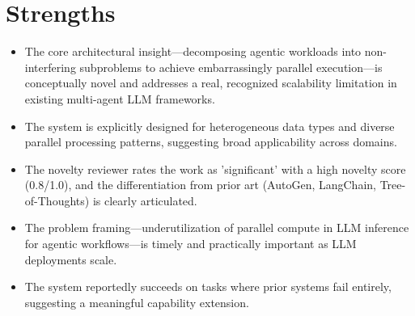 \documentclass[11pt]{article}
\begin{document}
\section*{Strengths}
\begin{itemize}[leftmargin=*]
  \item The core architectural insight—decomposing agentic workloads into non-interfering subproblems to achieve embarrassingly parallel execution—is conceptually novel and addresses a real, recognized scalability limitation in existing multi-agent LLM frameworks.
  \item The system is explicitly designed for heterogeneous data types and diverse parallel processing patterns, suggesting broad applicability across domains.
  \item The novelty reviewer rates the work as 'significant' with a high novelty score (0.8/1.0), and the differentiation from prior art (AutoGen, LangChain, Tree-of-Thoughts) is clearly articulated.
  \item The problem framing—underutilization of parallel compute in LLM inference for agentic workflows—is timely and practically important as LLM deployments scale.
  \item The system reportedly succeeds on tasks where prior systems fail entirely, suggesting a meaningful capability extension.
\end{itemize}
\end{document}
